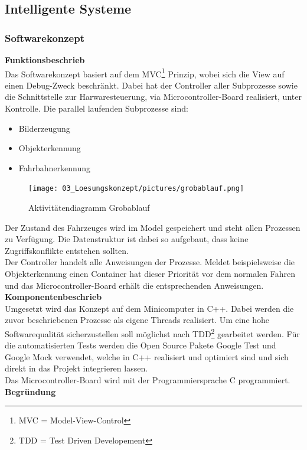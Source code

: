 \subsection{Intelligente Systeme}
\subsubsection{Softwarekonzept}
\textbf{Funktionsbeschrieb}\\[0.2cm]
Das Softwarekonzept basiert auf dem MVC\footnote{MVC = Model-View-Control} Prinzip, wobei sich die View auf einen Debug-Zweck beschränkt. Dabei hat der Controller aller Subprozesse sowie die Schnittstelle zur Harwaresteuerung, via Microcontroller-Board realisiert, unter Kontrolle. Die parallel laufenden  Subprozesse sind:
\begin{itemize}
\item Bilderzeugung
\item Objekterkennung
\item Fahrbahnerkennung
\end{itemize}
\begin{figure}[H]
	\centering
	\texttt{[image: 03\_Loesungskonzept/pictures/grobablauf.png]}
	\caption{Aktivitätendiagramm Grobablauf}
\end{figure}
Der Zustand des Fahrzeuges wird im Model gespeichert und steht allen Prozessen zu Verfügung. Die Datenstruktur ist dabei so aufgebaut, dass keine Zugriffskonflikte entstehen sollten.\\
Der Controller handelt alle Anweisungen der Prozesse. Meldet beispielsweise die Objekterkennung einen Container hat dieser Priorität vor dem normalen Fahren und das Microcontroller-Board erhält die entsprechenden Anweisungen.\\[0.2cm]
\textbf{Komponentenbeschrieb}\\[0.2cm]
Umgesetzt wird das Konzept auf dem Minicomputer in C++. Dabei werden die zuvor beschriebenen Prozesse als eigene Threads realisiert. Um eine hohe Softwarequalität sicherzustellen soll möglichst nach TDD\footnote{TDD = Test Driven Developement} gearbeitet werden. Für die automatisierten Tests werden die Open Source Pakete Google Test und Google Mock verwendet, welche in C++ realisiert und optimiert sind und sich direkt in das Projekt integrieren lassen.\\
Das Microcontroller-Board wird mit der Programmiersprache C programmiert.\\[0.2cm]
\textbf{Begründung}\\[0.2cm]
